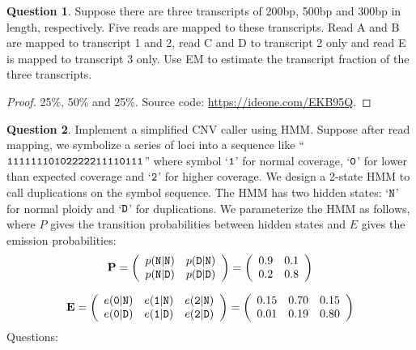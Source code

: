 \documentclass{article}[10pt]
\theoremstyle{definition}\newtheorem{question}{Question}
\begin{document}
\begin{question}
Suppose there are three transcripts of 200bp, 500bp and 300bp in length, respectively.
Five reads are mapped to these transcripts. Read A and B are mapped to transcript 1 and 2,
read C and D to transcript 2 only and read E is mapped to transcript 3 only.
Use EM to estimate the transcript fraction of the three transcripts.
\end{question}

\begin{proof}
25\%, 50\% and 25\%. Source code: \url{https://ideone.com/EKB95Q}.
\end{proof}



\begin{question}
Implement a simplified CNV caller using HMM. Suppose after read mapping, we
symbolize a series of loci into a sequence like ``${\tt
11111110102222211110111}$'' where symbol `${\tt 1}$' for normal coverage,
`${\tt 0}$' for lower than expected coverage and `${\tt 2}$' for higher
coverage. We design a 2-state HMM to call duplications on the symbol sequence.
The HMM has two hidden states: `${\tt N}$' for normal ploidy and `${\tt D}$' for
duplications. We parameterize the HMM as follows, where $P$ gives the transition
probabilities between hidden states and $E$ gives the emission probabilities:
$$
{\bf P}=\left(\begin{array}{ll}
p({\tt N}|{\tt N}) & p({\tt D}|{\tt N}) \\
p({\tt N}|{\tt D}) & p({\tt D}|{\tt D})
\end{array}\right)
=\left(\begin{array}{ll}
0.9 & 0.1 \\
0.2 & 0.8
\end{array}\right)
$$
\end{question}
$$
{\bf E}=\left(\begin{array}{lll}
e({\tt 0}|{\tt N}) & e({\tt 1}|{\tt N}) & e({\tt 2}|{\tt N})\\
e({\tt 0}|{\tt D}) & e({\tt 1}|{\tt D}) & e({\tt 2}|{\tt D})
\end{array}\right)
=\left(\begin{array}{lll}
0.15 & 0.70 & 0.15\\
0.01 & 0.19 & 0.80
\end{array}\right)
$$
Questions:
\end{document}
